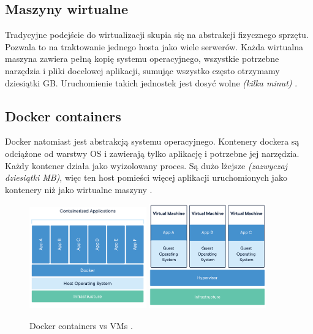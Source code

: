 \subsection{Maszyny wirtualne}

Tradycyjne podejście do wirtualizacji skupia się na abstrakcji fizycznego sprzętu. 
Pozwala to na traktowanie jednego hosta jako wiele serwerów. 
Każda wirtualna maszyna zawiera pełną kopię systemu operacyjnego, wszystkie potrzebne narzędzia i pliki docelowej aplikacji, sumując wszystko często otrzymamy dziesiątki GB.
Uruchomienie takich jednostek jest dosyć wolne {\em (kilka minut)} \cite{docker-c}.
    
\subsection{Docker containers}

Docker natomiast jest abstrakcją systemu operacyjnego. Kontenery dockera są odciążone od warstwy OS i zawierają tylko aplikację i potrzebne jej narzędzia.
Każdy kontener działa jako wyizolowany proces. Są dużo lżejsze {\em (zazwyczaj dziesiątki MB)}, 
więc ten host pomieści więcej aplikacji uruchomionych jako kontenery niż jako wirtualne maszyny \cite{docker-c}.

\begin{figure}[h!]
	\begin{center}
		\includegraphics[width=0.45\textwidth]{img/docker-layers}
		\hspace{5mm}
		\includegraphics[width=0.45\textwidth]{img/vm-layers}
	\end{center}
	\caption{Docker containers vs VMs \cite{docker-c}.}
	\label{fig:docker-vms}
\end{figure}

